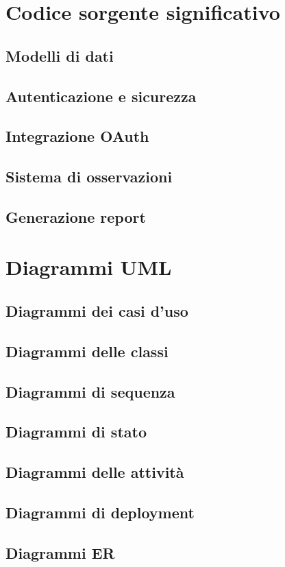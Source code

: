 \documentclass[12pt,a4paper,oneside]{report}
\begin{document}
\chapter{Codice sorgente significativo}
\section{Modelli di dati}
\section{Autenticazione e sicurezza}
\section{Integrazione OAuth}
\section{Sistema di osservazioni}
\section{Generazione report}

\chapter{Diagrammi UML}
\section{Diagrammi dei casi d'uso}
\section{Diagrammi delle classi}
\section{Diagrammi di sequenza}
\section{Diagrammi di stato}
\section{Diagrammi delle attività}
\section{Diagrammi di deployment}
\section{Diagrammi ER}
\end{document}
